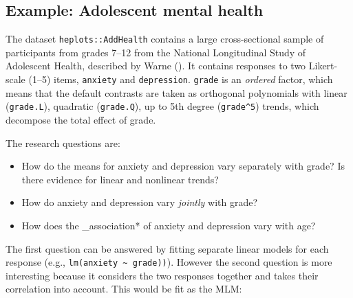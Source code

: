\documentclass[
  letterpaper,
  10pt,
  krantz2]{krantz}
\makeatletter
\newenvironment{Shaded}{\begin{snugshade}}{\end{snugshade}}
\newcommand{\AttributeTok}[1]{\textcolor[rgb]{0.40,0.45,0.13}{#1}}
\newcommand{\CommentTok}[1]{\textcolor[rgb]{0.37,0.37,0.37}{#1}}
\newcommand{\FunctionTok}[1]{\textcolor[rgb]{0.28,0.35,0.67}{#1}}
\newcommand{\NormalTok}[1]{\textcolor[rgb]{0.00,0.23,0.31}{#1}}
\newcommand{\StringTok}[1]{\textcolor[rgb]{0.13,0.47,0.30}{#1}}
\providecommand{\tightlist}{%
  \setlength{\itemsep}{0pt}\setlength{\parskip}{0pt}}\usepackage{longtable,booktabs,array}
\newenvironment{kframe}{%
  \medskip{}
  \setlength{\fboxsep}{.8em}
  \def\at@end@of@kframe{}%
  \ifinner\ifhmode%
  \def\at@end@of@kframe{\end{minipage}}%
  \begin{minipage}{\columnwidth}%
  \fi\fi%
  \def\FrameCommand##1{\hskip\@totalleftmargin \hskip-\fboxsep
  \colorbox{shadecolor}{##1}\hskip-\fboxsep
      \hskip-\linewidth \hskip-\@totalleftmargin \hskip\columnwidth}%
  \MakeFramed {\advance\hsize-\width
    \@totalleftmargin\z@ \linewidth\hsize
    \@setminipage}}%
{\par\unskip\endMakeFramed%
  \at@end@of@kframe}
\renewenvironment{Shaded}{\begin{kframe}}{\end{kframe}}
\makeatother
\begin{document}
\subsection{Example: Adolescent mental
health}\label{example-adolescent-mental-health}

The dataset \texttt{heplots::AddHealth} contains a large cross-sectional
sample of participants from grades 7--12 from the National Longitudinal
Study of Adolescent Health, described by Warne
(). It contains responses to two
Likert-scale (1--5) items, \texttt{anxiety} and \texttt{depression}.
\texttt{grade} is an \emph{ordered} factor, which means that the default
contrasts are taken as orthogonal polynomials with linear
(\texttt{grade.L}), quadratic (\texttt{grade.Q}), up to 5th degree
(\texttt{grade\^{}5}) trends, which decompose the total effect of grade.

\begin{Shaded}
\end{Shaded}

The research questions are:

\begin{itemize}
\tightlist
\item
  How do the means for anxiety and depression vary separately with
  grade? Is there evidence for linear and nonlinear trends?
\item
  How do anxiety and depression vary \emph{jointly} with grade?
\item
  How does the \_association* of anxiety and depression vary with age?
\end{itemize}

The first question can be answered by fitting separate linear models for
each response (e.g., \texttt{lm(anxiety\ \textasciitilde{}\ grade))}).
However the second question is more interesting because it considers the
two responses together and takes their correlation into account. This
would be fit as the MLM:
\end{document}
